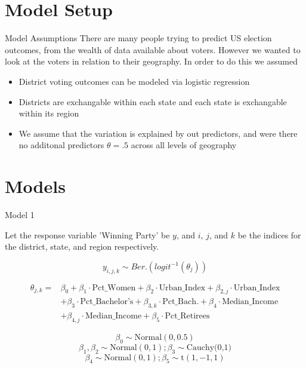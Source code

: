\documentclass{beamer}
\begin{document}
\section{Model Setup}
\begin{frame}{Model Assumptions}
  There are many people trying to predict US election outcomes, from the wealth of data available about voters. However we wanted to look at the voters in relation to their geography. In order to do this we assumed 
  \begin{itemize}
    \item District voting outcomes can be modeled via logistic regression 
    \item Districts are exchangable within each state and each state is exchangable within its region
    \item We assume that the variation is explained by out predictors, and were there no additonal predictors $\theta = .5$ across all levels of geography 
  \end{itemize}
  \end{frame}





\section{Models}

\begin{frame}{Model 1}


    Let the response variable 'Winning Party' be \(y\), and \(i\), \(j\), and \(k\) be the indices for the district, state, and region respectively. 

    \[y_{i,j,k} \sim Ber.(logit^{-1}(\theta_{j}))\]
    
\[
\begin{aligned}
   \theta_{j,k} = &\beta_0 + \beta_1 \cdot \text{Pct\_Women} + \beta_2 \cdot \text{Urban\_Index} + \beta_{2,j} \cdot \text{Urban\_Index} \\
    &+ \beta_3 \cdot \text{Pct\_Bachelor's} + \beta_{3,k} \cdot \text{Pct\_Bach.} + \beta_{4} \cdot \text{Median\_Income} \\ 
    &+ \beta_{4,j} \cdot \text{Median\_Income} + \beta_{5} \cdot \text{Pct\_Retirees}
\end{aligned}
\]

    \[\beta_0 \sim \text{Normal}(0, 0.5)\]
    \[\beta_1, \beta_2 \sim \text{Normal}(0, 1); \beta_3 \sim \text{Cauchy(0,1)}\] 
    \[\beta_4 \sim \text{Normal}(0,1); \beta_5 \sim \text{t}(1,-1,1)\]
    
\end{frame}
\end{document}
